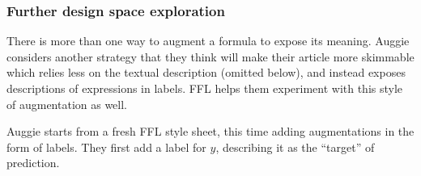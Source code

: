 \subsubsection*{Further design space exploration} There is more than one way to augment a formula to expose its meaning. Auggie considers another strategy that they think will make their article more skimmable which relies less on the textual description (omitted below), and instead exposes descriptions of expressions in labels. FFL helps them experiment with this style of augmentation as well.

Auggie starts from a fresh FFL style sheet, this time adding augmentations in the form of labels. They first add a label for $y$, describing it as the ``target'' of prediction.\\[1ex]


